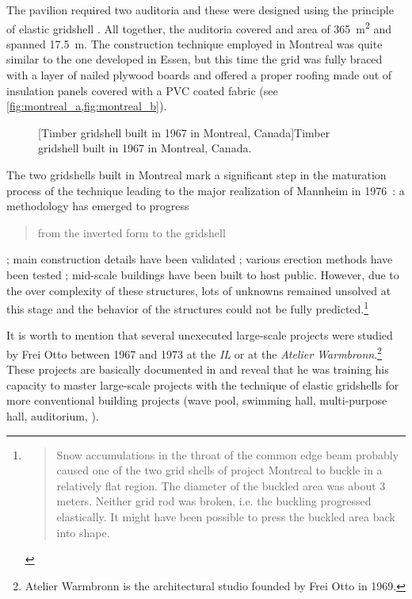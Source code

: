 The pavilion required two auditoria and these were designed using the principle of elastic gridshell \cite[p.~274]{IL10}. All together, the auditoria covered and area of \SI{365}{m^2} and spanned \SI{17.5}{m}. The construction technique employed in Montreal was quite similar to the one developed in Essen, but this time the grid was fully braced with a layer of nailed plywood boards and offered a proper roofing made out of insulation panels covered with a PVC coated fabric (see \cref{fig:montreal_a,fig:montreal_b}).
\begin{figure}[t]
		\hspace*{\fill}
		\vspace{10pt}
		[Timber gridshell built in 1967 in Montreal, Canada]{Timber gridshell built in 1967 in Montreal, Canada.}
		\label{fig:montreal}    
\end{figure}

The two gridshells built in Montreal mark a significant step in the maturation process of the technique leading to the major realization of Mannheim in 1976~: a methodology has emerged to progress \blockcquote[p.~179]{IL10}{from the inverted form to the gridshell} ; main construction details have been validated ; various erection methods have been tested ; mid-scale buildings have been built to host public. However, due to the over complexity of these structures, lots of unknowns remained unsolved at this stage and the behavior of the structures could not be fully predicted.\footnote{\blockcquote[p.~219]{IL10}{Snow accumulations in the throat of the common edge beam probably caused one of the two grid shells of project Montreal to buckle in a relatively flat region. The diameter of the buckled area was about 3 meters. Neither grid rod was broken, i.e. the buckling progressed elastically. It might have been possible to press the buckled area back into shape.}}

It is worth to mention that several unexecuted large-scale projects were studied by Frei Otto between 1967 and 1973 at the \emph{IL} or at the \emph{Atelier Warmbronn}.\footnote{Atelier Warmbronn is the architectural studio founded by Frei Otto in 1969.} These projects are basically documented in \cite[pp.~278 - 288]{IL10} and reveal that he was training his capacity to master large-scale projects with the technique of elastic gridshells for more conventional building projects (wave pool, swimming hall, multi-purpose hall, auditorium, \telp{}).

